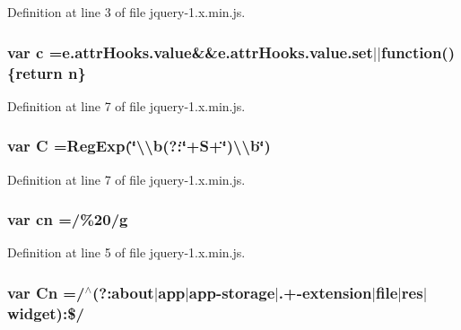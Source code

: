 Definition at line 3 of file jquery-\/1.\+x.\+min.\+js.

\subsubsection[{\texorpdfstring{c}{c}}]{\setlength{\rightskip}{0pt plus 5cm}var c ={\bf e.\+attr\+Hooks.\+value}\&\&{\bf e.\+attr\+Hooks.\+value.\+set}$\vert$$\vert$function()\{return {\bf n}\}}\hypertarget{jquery-1_8x_8min_8js_abce695e0af988ece0826d9ad59b8160d}{}\label{jquery-1_8x_8min_8js_abce695e0af988ece0826d9ad59b8160d}


Definition at line 7 of file jquery-\/1.\+x.\+min.\+js.

\subsubsection[{\texorpdfstring{C}{C}}]{\setlength{\rightskip}{0pt plus 5cm}var C =Reg\+Exp(\char`\"{}\textbackslash{}\textbackslash{}b(?\+:\char`\"{}+S+\char`\"{})\textbackslash{}\textbackslash{}b\char`\"{})}\hypertarget{jquery-1_8x_8min_8js_ae59e0ac8d0c43c81f50236f719763efc}{}\label{jquery-1_8x_8min_8js_ae59e0ac8d0c43c81f50236f719763efc}


Definition at line 7 of file jquery-\/1.\+x.\+min.\+js.

\subsubsection[{\texorpdfstring{cn}{cn}}]{\setlength{\rightskip}{0pt plus 5cm}var cn =/\%20/{\bf g}}\hypertarget{jquery-1_8x_8min_8js_a43c2bda2537661fb64e62fdfdcea1560}{}\label{jquery-1_8x_8min_8js_a43c2bda2537661fb64e62fdfdcea1560}


Definition at line 5 of file jquery-\/1.\+x.\+min.\+js.

\subsubsection[{\texorpdfstring{Cn}{Cn}}]{\setlength{\rightskip}{0pt plus 5cm}var Cn =/$^\wedge$(?\+:about$\vert$app$\vert$app-\/storage$\vert$.+-\/extension$\vert${\bf file}$\vert${\bf res}$\vert${\bf widget})\+:\$/}\hypertarget{jquery-1_8x_8min_8js_ab832fcb3f80f807f0b65d1e3b4904de8}{}\label{jquery-1_8x_8min_8js_ab832fcb3f80f807f0b65d1e3b4904de8}


